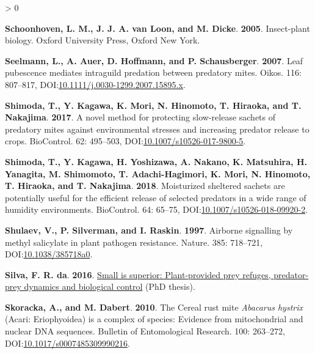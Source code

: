 \documentclass{ufdissertation}[overrideChapters] %
\newlength{\cslhangindent}
\newenvironment{CSLReferences}[2] %
 {%
  \setlength{\parindent}{0pt}
  \ifodd #1 \everypar{\setlength{\hangindent}{\cslhangindent}}\ignorespaces\fi
  \ifnum #2 > 0
  \setlength{\parskip}{#2\baselineskip}
  \fi
 }%
 {}
\begin{document}
{\begin{CSLReferences}{1}{1}
\leavevmode{}%
\textbf{Schoonhoven, L. M., J. J. A. van Loon, and M. Dicke}. \textbf{2005}. Insect-plant biology. Oxford University Press, Oxford New York.

\leavevmode{}%
\textbf{Seelmann, L., A. Auer, D. Hoffmann, and P. Schausberger}. \textbf{2007}. Leaf pubescence mediates intraguild predation between predatory mites. Oikos. 116: 807--817, DOI:\href{https://doi.org/10.1111/j.0030-1299.2007.15895.x}{10.1111/j.0030-1299.2007.15895.x}.

\leavevmode{}%
\textbf{Shimoda, T., Y. Kagawa, K. Mori, N. Hinomoto, T. Hiraoka, and T. Nakajima}. \textbf{2017}. A novel method for protecting slow-release sachets of predatory mites against environmental stresses and increasing predator release to crops. {BioControl}. 62: 495--503, DOI:\href{https://doi.org/10.1007/s10526-017-9800-5}{10.1007/s10526-017-9800-5}.

\leavevmode{}%
\textbf{Shimoda, T., Y. Kagawa, H. Yoshizawa, A. Nakano, K. Matsuhira, H. Yanagita, M. Shimomoto, T. Adachi-Hagimori, K. Mori, N. Hinomoto, T. Hiraoka, and T. Nakajima}. \textbf{2018}. Moisturized sheltered sachets are potentially useful for the efficient release of selected predators in a wide range of humidity environments. {BioControl}. 64: 65--75, DOI:\href{https://doi.org/10.1007/s10526-018-09920-2}{10.1007/s10526-018-09920-2}.

\leavevmode{}%
\textbf{Shulaev, V., P. Silverman, and I. Raskin}. \textbf{1997}. Airborne signalling by methyl salicylate in plant pathogen resistance. Nature. 385: 718--721, DOI:\href{https://doi.org/10.1038/385718a0}{10.1038/385718a0}.

\leavevmode{}%
\textbf{Silva, F. R. da}. \textbf{2016}. \href{https://hdl.handle.net/11245/1.536208}{Small is superior: Plant-provided prey refuges, predator-prey dynamics and biological control} (PhD thesis).

\leavevmode{}%
\textbf{Skoracka, A., and M. Dabert}. \textbf{2010}. The {Cereal rust mite} {\emph{Abacarus hystrix}} ({Acari}: {Eriophyoidea}) is a complex of species: Evidence from mitochondrial and nuclear {DNA} sequences. Bulletin of Entomological Research. 100: 263--272, DOI:\href{https://doi.org/10.1017/s0007485309990216}{10.1017/s0007485309990216}.


\end{CSLReferences}}
\end{document}
